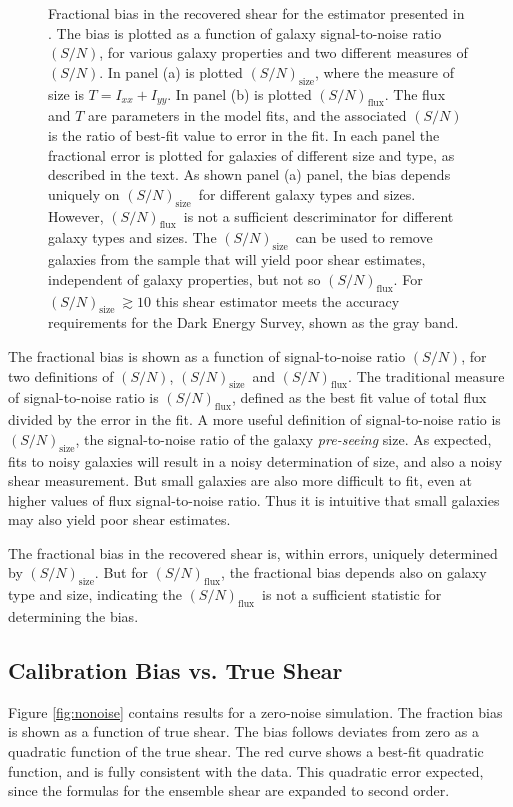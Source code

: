 \documentclass[12pt,preprint]{aastex}
\newcommand{\Tsn}{$(S/N)_{\textrm{size}}$}
\newcommand{\fsn}{$(S/N)_{\textrm{flux}}$}
\begin{document}
\begin{figure}[p]
 \caption{ Fractional bias in the recovered shear for the estimator presented
     in \cite{ba13}.  The bias is plotted as a
     function of galaxy signal-to-noise ratio $(S/N)$, for various galaxy
     properties and two different measures of $(S/N)$.  In panel (a) is
     plotted \Tsn, where the measure of size is $T=I_{xx} + I_{yy}$.  In 
     panel (b) is plotted \fsn.  The flux and $T$ are parameters in the model
     fits, and the associated $(S/N)$ is the ratio of best-fit value to error in
     the fit.  In each panel the fractional error is plotted for galaxies of
     different size and type, as described in the text.  As shown panel (a)
     panel, the bias depends uniquely on \Tsn\ for different galaxy types and
     sizes.  However, \fsn\ is not a sufficient descriminator for different
     galaxy types and sizes.  The \Tsn\ can be used to remove galaxies from the
     sample that will yield poor shear estimates, independent of galaxy
     properties, but not so \fsn.  For \Tsn$~ \gtrsim 10$ this shear estimator meets
 the accuracy requirements for the Dark Energy Survey, shown as the gray band.
 \label{fig:fracerr}}

\end{figure}

The fractional bias is shown as a function of signal-to-noise ratio $(S/N)$,
for two definitions of $(S/N)$, \Tsn\ and \fsn.  The traditional measure of
signal-to-noise ratio is \fsn, defined as the best fit value of total
flux divided by the error in the fit.  A more useful definition of
signal-to-noise ratio is \Tsn, the signal-to-noise ratio of the galaxy {\it
pre-seeing} size.  As expected, fits to noisy galaxies will result in a noisy
determination of size, and also a noisy shear measurement. But small galaxies
are also more difficult to fit, even at higher values of flux signal-to-noise
ratio.  Thus it is intuitive that small galaxies may also yield poor shear
estimates.

The fractional bias in the recovered shear is, within errors, uniquely
determined by \Tsn.  But for \fsn, the fractional bias depends also on galaxy
type and size, indicating the \fsn\ is not a sufficient statistic for
determining the bias.

\subsection{Calibration Bias vs. True Shear} \label{sec:truebias}

Figure \ref{fig:nonoise} contains results for a zero-noise simulation.  The
fraction bias is shown as a function of true shear.  The bias follows deviates
from zero as a quadratic function of the true shear.  The red curve shows a
best-fit quadratic function, and is fully consistent with the data.  This
quadratic error expected, since the formulas for the ensemble shear are expanded
to second order.
\end{document}
